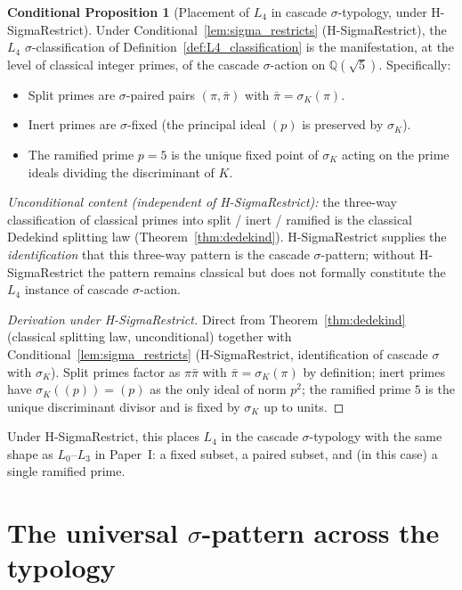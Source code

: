 \documentclass[11pt,a4paper]{article}
\theoremstyle{definition}
\newtheorem{conditional}[theorem]{Conditional Proposition}
\theoremstyle{remark}
\begin{document}
\begin{conditional}[Placement of $L_4$ in cascade $\sigma$-typology, under H-SigmaRestrict]\label{thm:L4_placement}
Under Conditional~\ref{lem:sigma_restricts} (H-SigmaRestrict), the
$L_4$ $\sigma$-classification of Definition~\ref{def:L4_classification}
is the manifestation, at the level of classical integer primes, of the
cascade $\sigma$-action on $\mathbb{Q}(\sqrt{5})$. Specifically:
\begin{itemize}\itemsep0pt
  \item Split primes are $\sigma$-paired pairs $(\pi, \bar{\pi})$ with $\bar{\pi} = \sigma_K(\pi)$.
  \item Inert primes are $\sigma$-fixed (the principal ideal $(p)$ is preserved by $\sigma_K$).
  \item The ramified prime $p = 5$ is the unique fixed point of $\sigma_K$ acting on the prime ideals dividing the discriminant of $K$.
\end{itemize}

\noindent\emph{Unconditional content (independent of H-SigmaRestrict):} the
three-way classification of classical primes into split / inert /
ramified is the classical Dedekind splitting law
(Theorem~\ref{thm:dedekind}). H-SigmaRestrict supplies the
\emph{identification} that this three-way pattern is the cascade
$\sigma$-pattern; without H-SigmaRestrict the pattern remains classical
but does not formally constitute the $L_4$ instance of cascade
$\sigma$-action.
\end{conditional}

\begin{proof}[Derivation under H-SigmaRestrict]
Direct from Theorem~\ref{thm:dedekind} (classical splitting law,
unconditional) together with Conditional~\ref{lem:sigma_restricts}
(H-SigmaRestrict, identification of cascade $\sigma$ with $\sigma_K$).
Split primes factor as $\pi \bar{\pi}$ with $\bar{\pi} = \sigma_K(\pi)$
by definition; inert primes have $\sigma_K((p)) = (p)$ as the only
ideal of norm $p^2$; the ramified prime $5$ is the unique discriminant
divisor and is fixed by $\sigma_K$ up to units.
\end{proof}

Under H-SigmaRestrict, this places $L_4$ in the cascade $\sigma$-typology
with the same shape as $L_0$--$L_3$ in Paper~I: a fixed subset, a paired
subset, and (in this case) a single ramified prime.

\section{The universal $\sigma$-pattern across the typology}\label{sec:universal}
\end{document}

